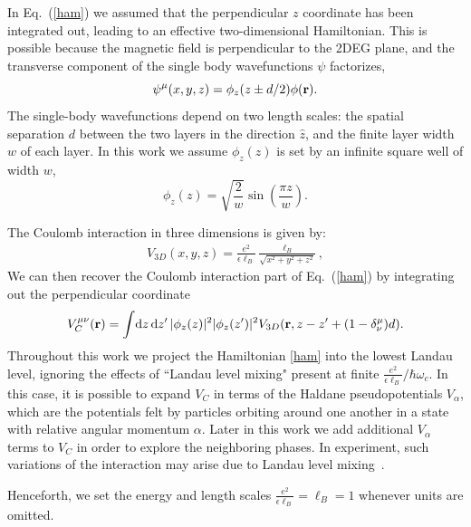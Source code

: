 In Eq.~(\ref{ham}) we assumed that the perpendicular $z$ coordinate has been integrated out, leading to an effective two-dimensional Hamiltonian.
This is possible because the magnetic field is perpendicular to the 2DEG plane, and the transverse component of the single body wavefunctions $\psi$ factorizes,
\begin{equation}
\psi^\mu(x,y,z)=\phi_z(z \pm d / 2)  \phi({\mathbf{r}}).
\end{equation}
The single-body wavefunctions depend on two length scales: the spatial separation $d$ between the two layers in the direction $\hat{z}$, and the finite layer width $w$ of each layer. In this work we assume $\phi_z(z)$ is set by an infinite square well of width $w$, 
\begin{equation}
\phi_z(z)=\sqrt{\frac{2}{w}} \sin\left(\frac{\pi z}{w}\right). 
\end{equation}
 
The Coulomb interaction in three dimensions is given by:
\begin{align}
	V_{3D}(x,y,z)=\frac{e^2}{\epsilon \ell_B}\frac{\ell_B}{\sqrt{x^2+y^2+z^2}},
\end{align}
We can then recover the Coulomb interaction part of Eq.~(\ref{ham}) by integrating out the perpendicular coordinate
\begin{equation}
	V_C^{\mu\nu}({\mathbf{r}})=\int\! \mathrm{d} z \, \mathrm{d} z^\prime \, |\phi_z(z)|^2 |\phi_z(z^\prime)|^2
	\\ V_{3D}({\mathbf{r}},z - z^\prime +  (1-\delta^\mu_\nu) d) .
\end{equation}
Throughout this work we project the Hamiltonian \eqref{ham} into the lowest Landau level,  ignoring the effects of ``Landau level mixing"  present at finite $ \frac{e^2}{\epsilon\ell_B} / \hbar \omega_c$.
In this case, it is possible to expand $V_C$ in terms of the Haldane pseudopotentials $V_\alpha$, which are the potentials felt by particles orbiting around one another in a state with relative angular momentum $\alpha$.
Later in this work we add additional $V_\alpha$ terms to $V_C$ in order to explore the neighboring phases.
In experiment, such variations of the interaction may arise due to Landau level mixing~\cite{BisharaNayakMixing, WojsMixing, RezayiSimonMixing, Papic12, SodemannMixing, PetersonMixing, SimonRezayiMixing, ZaletelMixing, PakrouskiMixing}.

Henceforth, we set the energy and length scales $\frac{e^2}{\epsilon\ell_B} = \ell_B = 1$ whenever units are omitted.



